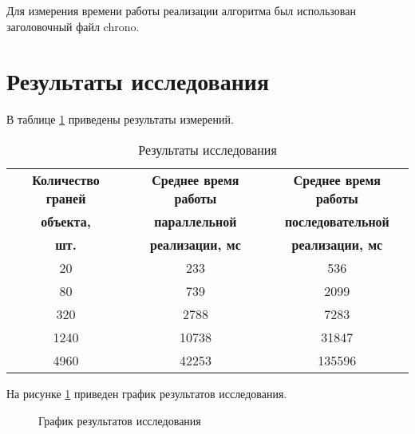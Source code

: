 Для измерения времени работы реализации алгоритма был использован заголовочный файл chrono.

\section{Результаты исследования}

В таблице \ref{restable} приведены результаты измерений.

\begin{table}[H]
	\begin{center}
		\caption{\label{restable}Результаты исследования}
		\begin{tabular}{|c|c|c|}
			\hline
			\bf{Количество граней} & \bf{Среднее время работы} & \bf{Среднее время работы}\\
			\bf{объекта,} & \bf{параллельной} & \bf{последовательной}\\
			\bf{шт.} & \bf{реализации, мс} & \bf{реализации, мс}\\
			\hline
			20 & 233 & 536\\
			\hline
			80 & 739 & 2099\\
			\hline
			320 & 2788 & 7283\\
			\hline
			1240 & 10738 & 31847\\
			\hline
			4960 & 42253 & 135596\\
			\hline
		\end{tabular}
	\end{center}
\end{table}

На рисунке \ref{resgraph} приведен график результатов исследования.

\begin{figure}[H]
	\begin{center}
		\caption{\label{resgraph}График результатов исследования}
	\end{center}
\end{figure}

